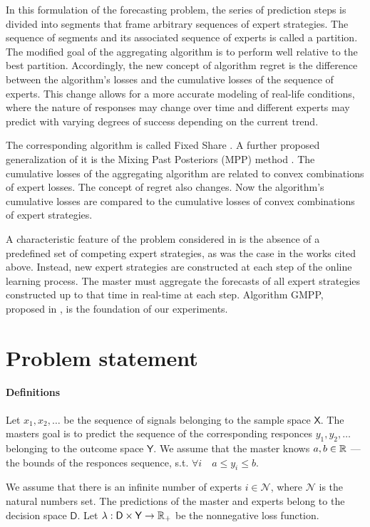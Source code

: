 \documentclass[12pt, twoside]{article}
\begin{document}
In this formulation of the forecasting problem, the series of prediction steps is divided into segments that frame arbitrary sequences of expert strategies. 
The sequence of segments and its associated sequence of experts is called a partition. 
The modified goal of the aggregating algorithm is to perform well relative to the best partition. 
Accordingly, the new concept of algorithm regret is the difference between the algorithm's losses and the cumulative losses of the sequence of experts. 
This change allows for a more accurate modeling of real-life conditions, where the nature of responses may change over time and different experts may predict with varying degrees of success depending on the current trend. 

The corresponding algorithm is called Fixed Share \cite{article98}. 
A further proposed generalization of it is the Mixing Past Posteriors (MPP) method \cite{article02}. 
The cumulative losses of the aggregating algorithm are related to convex combinations of expert losses. 
The concept of regret also changes. 
Now the algorithm's cumulative losses are compared to the cumulative losses of convex combinations of expert strategies.

A characteristic feature of the problem considered in \cite{article} is the absence of a predefined set of competing expert strategies, as was the case in the works cited above.
Instead, new expert strategies are constructed at each step of the online learning process.
The master must aggregate the forecasts of all expert strategies constructed up to that time in real-time at each step. 
Algorithm GMPP, proposed in \cite{article}, is the foundation of our experiments. 

\section{Problem statement}
\paragraph{Definitions}
Let $x_1, x_2, \dots$ be the sequence of signals belonging to the sample space  $\mathsf{X}$. 
The masters goal is to predict the sequence of the corresponding responces $y_1, y_2, \dots$ belonging to the outcome space $\mathsf{Y}$. 
We assume that the master knows $a, b \in \mathbb{R}$ --- the bounds of the responces sequence, s.t. $\forall i\quad a \leq y_i \leq b$.

We assume that there is an infinite number of experts $i \in \mathcal{N}$, where $\mathcal{N}$ is the natural numbers set. 
The predictions of the master and experts belong to the decision space $\mathsf{D}$. 
Let $ \lambda: \mathsf{D} \times \mathsf{Y} \rightarrow \RR_+$ be the nonnegative loss function. 
\end{document}
